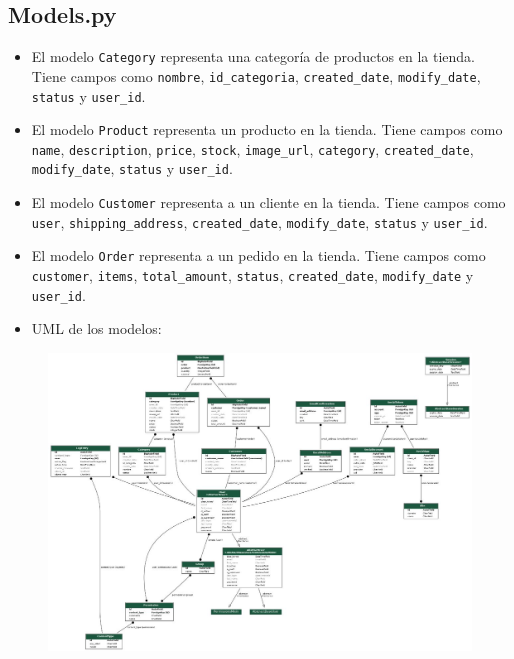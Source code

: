 \documentclass{article}
\begin{document}
	\subsection{Models.py}
	\begin{itemize}
		\item El modelo \texttt{Category} representa una categoría de productos en la tienda. Tiene campos como \texttt{nombre}, \texttt{id\_categoria}, \texttt{created\_date}, \texttt{modify\_date}, \texttt{status} y \texttt{user\_id}.
		\item El modelo \texttt{Product} representa un producto en la tienda. Tiene campos como \texttt{name}, \texttt{description}, \texttt{price}, \texttt{stock}, \texttt{image\_url}, \texttt{category}, \texttt{created\_date}, \texttt{modify\_date}, \texttt{status} y \texttt{user\_id}.
		\item El modelo \texttt{Customer} representa a un cliente en la tienda. Tiene campos como \texttt{user}, \texttt{shipping\_address}, \texttt{created\_date}, \texttt{modify\_date}, \texttt{status} y \texttt{user\_id}.
		\item El modelo \texttt{Order} representa a un pedido en la tienda. Tiene campos como \texttt{customer}, \texttt{items}, \texttt{total\_amount}, \texttt{status}, \texttt{created\_date}, \texttt{modify\_date} y \texttt{user\_id}.
	\end{itemize}
	
	


		

	\begin{itemize}	
		\item UML de los modelos:
	\end{itemize}	

	\begin{figure}[H]
		\centering
		\includegraphics[width=1\textwidth,keepaspectratio]{img/UML.jpeg}
	\end{figure}
\end{document}
